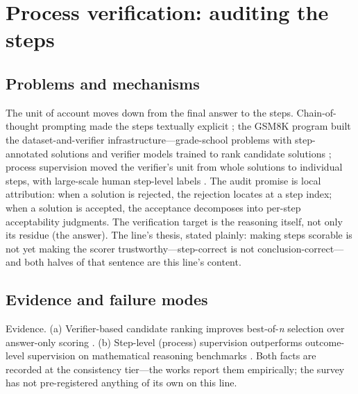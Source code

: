 \documentclass[11pt,a4paper]{article}
\begin{document}
\section{Process verification: auditing the steps}

\subsection{Problems and mechanisms}

The unit of account moves down from the final answer to the steps. Chain-of-thought prompting made the steps textually explicit \cite{key01}; the GSM8K program built the dataset-and-verifier infrastructure—grade-school problems with step-annotated solutions and verifier models trained to rank candidate solutions \cite{key05}; process supervision moved the verifier's unit from whole solutions to individual steps, with large-scale human step-level labels \cite{key06}. The audit promise is local attribution: when a solution is rejected, the rejection locates at a step index; when a solution is accepted, the acceptance decomposes into per-step acceptability judgments. The verification target is the reasoning itself, not only its residue (the answer). The line's thesis, stated plainly: making steps scorable is not yet making the scorer trustworthy—step-correct is not conclusion-correct—and both halves of that sentence are this line's content.

\subsection{Evidence and failure modes}

Evidence. (a) Verifier-based candidate ranking improves best-of-\textit{n} selection over answer-only scoring \cite{key05}. (b) Step-level (process) supervision outperforms outcome-level supervision on mathematical reasoning benchmarks \cite{key06}. Both facts are recorded at the consistency tier—the works report them empirically; the survey has not pre-registered anything of its own on this line.
\end{document}
